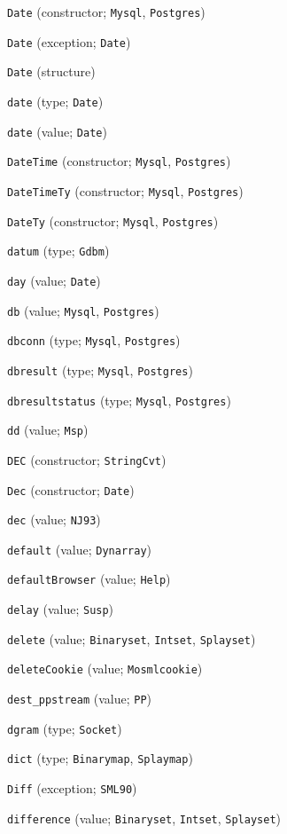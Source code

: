 \begin{description}
\item[] \verb"Date" (constructor; \verb"Mysql", \verb"Postgres")
\item[] \verb"Date" (exception; \verb"Date")
\item[] \verb"Date" (structure)
\item[] \verb"date" (type; \verb"Date")
\item[] \verb"date" (value; \verb"Date")
\item[] \verb"DateTime" (constructor; \verb"Mysql", \verb"Postgres")
\item[] \verb"DateTimeTy" (constructor; \verb"Mysql", \verb"Postgres")
\item[] \verb"DateTy" (constructor; \verb"Mysql", \verb"Postgres")
\item[] \verb"datum" (type; \verb"Gdbm")
\item[] \verb"day" (value; \verb"Date")
\item[] \verb"db" (value; \verb"Mysql", \verb"Postgres")
\item[] \verb"dbconn" (type; \verb"Mysql", \verb"Postgres")
\item[] \verb"dbresult" (type; \verb"Mysql", \verb"Postgres")
\item[] \verb"dbresultstatus" (type; \verb"Mysql", \verb"Postgres")
\item[] \verb"dd" (value; \verb"Msp")
\item[] \verb"DEC" (constructor; \verb"StringCvt")
\item[] \verb"Dec" (constructor; \verb"Date")
\item[] \verb"dec" (value; \verb"NJ93")
\item[] \verb"default" (value; \verb"Dynarray")
\item[] \verb"defaultBrowser" (value; \verb"Help")
\item[] \verb"delay" (value; \verb"Susp")
\item[] \verb"delete" (value; \verb"Binaryset", \verb"Intset", \verb"Splayset")
\item[] \verb"deleteCookie" (value; \verb"Mosmlcookie")
\item[] \verb"dest_ppstream" (value; \verb"PP")
\item[] \verb"dgram" (type; \verb"Socket")
\item[] \verb"dict" (type; \verb"Binarymap", \verb"Splaymap")
\item[] \verb"Diff" (exception; \verb"SML90")
\item[] \verb"difference" (value; \verb"Binaryset", \verb"Intset", \verb"Splayset")

\end{description}

